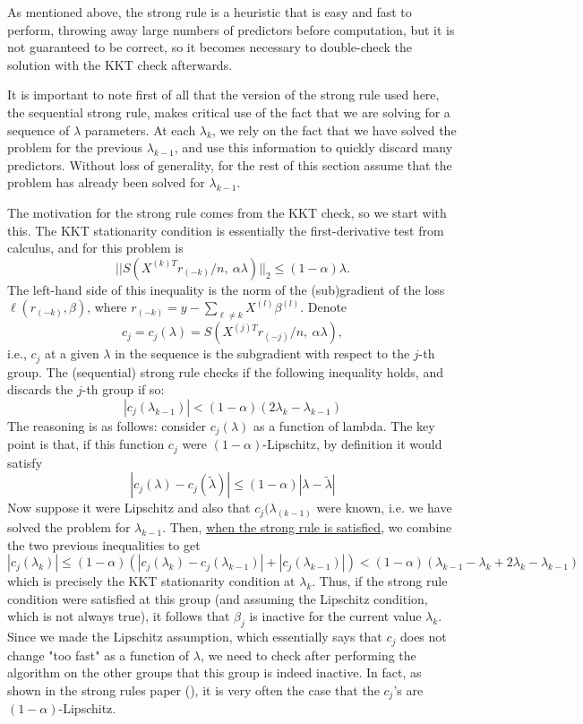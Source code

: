 \documentclass[titlepage]{article}
\begin{document}
As mentioned above, the strong rule \citep{tibshirani2012strong} is a heuristic that is easy and fast to perform, throwing away large numbers of predictors before computation, but it is not guaranteed to be correct, so it becomes necessary to double-check the solution with the KKT check afterwards. 

It is important to note first of all that the version of the strong rule used here, the sequential strong rule, makes critical use of the fact that we are solving for a sequence of $\lambda$ parameters. At each $\lambda_k$, we rely on the fact that we have solved the problem for the previous $\lambda_{k-1}$, and use this information to quickly discard many predictors. Without loss of generality, for the rest of this section assume that the problem has already been solved for $\lambda_{k-1}$.

The motivation for the strong rule comes from the KKT check, so we start with this. The KKT stationarity condition \citep{boyd2004convex} is essentially the first-derivative test from calculus, and for this problem is 
\[
||S(X^{(k)T}r_{(-k)}/n,\ \alpha\lambda)||_2 \leq (1-\alpha)\lambda.
\]
The left-hand side of this inequality is the norm of the (sub)gradient of the loss $\ell(r_{(-k)},\beta)$, where $r_{(-k)}= y - \sum_{\ell \neq k} X^{(l)}\beta^{(l)}$.
Denote 
\[
c_j = c_j(\lambda) = S(X^{(j)T}r_{(-j)}/n,\ \alpha\lambda),
\]
i.e., $c_j$ at a given $\lambda$ in the sequence is the subgradient with respect to the $j$-th group.
The (sequential) strong rule checks if the following inequality holds, and discards the $j$-th group if so:
\begin{equation}
|c_j(\lambda_{k-1})| < (1-\alpha)(2\lambda_k - \lambda_{k-1})
\label{eq:strongcond}
\end{equation}
The reasoning is as follows: consider $c_j(\lambda)$ as a function of lambda. The key point is that, if this function $c_j$ were $(1-\alpha)$-Lipschitz, by definition it would satisfy
\[
|c_j(\lambda) - c_j(\tilde{\lambda})|\leq (1-\alpha)|\lambda-\tilde{\lambda}|
\]
Now suppose it were Lipschitz and also that $c_j(\lambda_{(k-1)}$ were known, i.e. we have solved the problem for $\lambda_{k-1}$. Then, \underline{when the strong rule is satisfied}, we combine the two previous inequalities to get
\[
|c_j(\lambda_k)|\leq (1-\alpha)(|c_j(\lambda_k) - c_j(\lambda_{k-1})|+|c_j(\lambda_{k-1})|)<(1-\alpha)(\lambda_{k-1}-\lambda_k+2\lambda_{k}-\lambda_{k-1})
\]
which is precisely the KKT stationarity condition at $\lambda_k$. Thus, if the strong rule condition were satisfied at this group (and assuming the Lipschitz condition, which is not always true), it follows that $\beta_j$ is inactive for the current value $\lambda_k$. Since we made the Lipschitz assumption, which essentially says that $c_j$ does not change "too fast" as a function of $\lambda$, we need to check after performing the algorithm on the other groups that this group is indeed inactive. In fact, as shown in the strong rules paper (), it is very often the case that the $c_j$'s are $(1-\alpha)$-Lipschitz.
\end{document}
